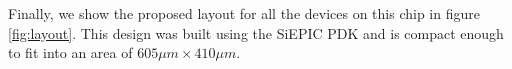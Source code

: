 \documentclass[journal]{IEEEtran}
\begin{document}

%



Finally, we show the proposed layout for all the devices on this chip in figure \ref{fig:layout}. This design was built using the SiEPIC PDK and is compact enough to fit into an area of $605 \mu m \times 410 \mu m $.
\end{document}
